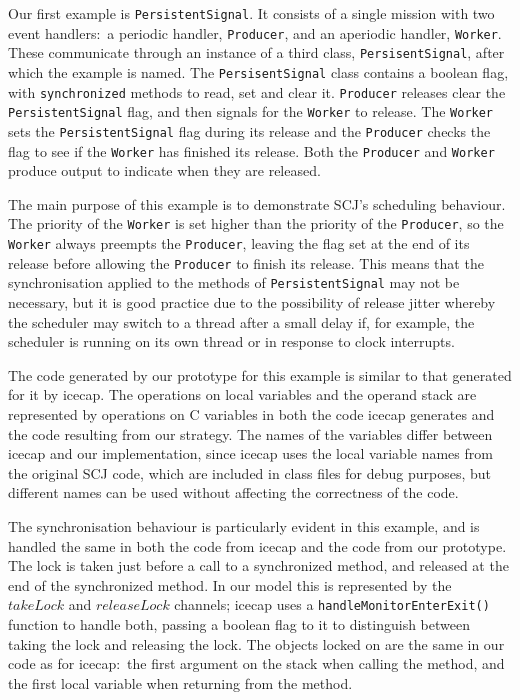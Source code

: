 Our first example is \texttt{PersistentSignal}. 
It consists of a single mission with two event handlers:~a periodic
handler, \texttt{Producer}, and an aperiodic handler, \texttt{Worker}.
These communicate through an instance of a third class,
\texttt{PersisentSignal}, after which the example is named.
The \texttt{PersisentSignal} class contains a boolean flag, with
\texttt{synchronized} methods to read, set and clear it.
\texttt{Producer} releases clear the \texttt{PersistentSignal} flag,
and then signals for the \texttt{Worker} to release.
The \texttt{Worker} sets the \texttt{PersistentSignal} flag during its
release and the \texttt{Producer} checks the flag to see if the
\texttt{Worker} has finished its release.
Both the \texttt{Producer} and \texttt{Worker} produce output to
indicate when they are released.

The main purpose of this example is to demonstrate SCJ's scheduling
behaviour.
The priority of the \texttt{Worker} is set higher than the priority of
the \texttt{Producer}, so the \texttt{Worker} always preempts the
\texttt{Producer}, leaving the flag set at the end of its release
before allowing the \texttt{Producer} to finish its release.
This means that the synchronisation applied to the methods of
\texttt{PersistentSignal} may not be necessary, but it is good
practice due to the possibility of release jitter whereby the
scheduler may switch to a thread after a small delay if, for example,
the scheduler is running on its own thread or in response to clock
interrupts.

The code generated by our prototype for this example is similar to
that generated for it by icecap.
The operations on local variables and the operand stack are
represented by operations on C variables in both the code icecap
generates and the code resulting from our strategy. 
The names of the variables differ between icecap and our
implementation, since icecap uses the local variable names from the
original SCJ code, which are included in class files for debug
purposes, but different names can be used without affecting the
correctness of the code.

The synchronisation behaviour is particularly evident in this example,
and is handled the same in both the code from icecap and the code from
our prototype.
The lock is taken just before a call to a synchronized method, and
released at the end of the synchronized method.
In our model this is represented by the $takeLock$ and $releaseLock$
channels; icecap uses a \texttt{handleMonitorEnterExit()} function to
handle both, passing a boolean flag to it to distinguish between taking
the lock and releasing the lock.
The objects locked on are the same in our code as for icecap:~the
first argument on the stack when calling the method, and the first
local variable when returning from the method.

